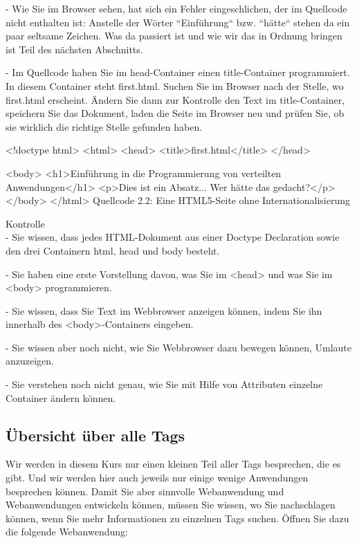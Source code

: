 -	Wie Sie im Browser sehen, hat sich ein Fehler eingeschlichen, der im Quellcode nicht enthalten ist: Anstelle der Wörter ``Einführung`` bzw. ``hätte`` stehen da ein paar seltsame Zeichen. Was da passiert ist und wie wir das in Ordnung bringen ist Teil des nächsten Abschnitts.

-	Im Quellcode haben Sie im head-Container einen title-Container programmiert. In diesem Container steht first.html. Suchen Sie im Browser nach der Stelle, wo first.html erscheint. Ändern Sie dann zur Kontrolle den Text im title-Container, speichern Sie das Dokument, laden die Seite im Browser neu und prüfen Sie, ob sie wirklich die richtige Stelle gefunden haben.

<!doctype html> 
<html> 
<head> 
<title>first.html</title> 
</head> 

<body> 
<h1>Einführung in die Programmierung von verteilten Anwendungen</h1>
<p>Dies ist ein Absatz... Wer hätte das gedacht?</p> 
</body> 
</html>
Quellcode 2.2: Eine HTML5-Seite ohne Internationalisierung

Kontrolle\\

-	Sie wissen, dass jedes HTML-Dokument aus einer Doctype Declaration sowie den drei Containern html, head und body besteht.

-	Sie haben eine erste Vorstellung davon, was Sie im <head> und was Sie im <body> programmieren.

-	Sie wissen, dass Sie Text im Webbrowser anzeigen können, indem Sie ihn innerhalb des <body>-Containers eingeben.

-	Sie wissen aber noch nicht, wie Sie Webbrowser dazu bewegen können, Umlaute anzuzeigen.

-	Sie verstehen noch nicht genau, wie Sie mit Hilfe von Attributen einzelne Container ändern können.

\subsection{Übersicht über alle Tags}

Wir werden in diesem Kurs nur einen kleinen Teil aller Tags besprechen, die es gibt. Und wir werden hier auch jeweils nur einige wenige Anwendungen besprechen können. Damit Sie aber sinnvolle Webanwendung und Webanwendungen entwickeln können, müssen Sie wissen, wo Sie nachschlagen können, wenn Sie mehr Informationen zu einzelnen Tags suchen. Öffnen Sie dazu die folgende Webanwendung:\\

